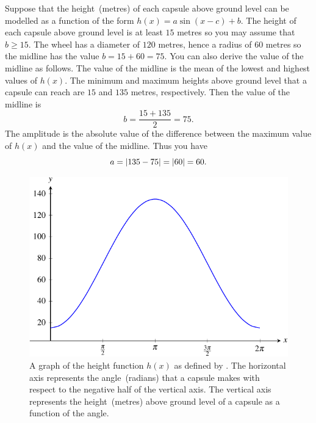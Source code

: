\documentclass[a4paper,oneside,12pt]{article}
\begin{document}
\begin{problem}
{\begin{solution}
Suppose that the height~(metres) of each capsule above ground level
can be modelled as a function of the form
$h(x) = a \sin(x - c) + b$.  The height of each capsule above ground
level is at least $15$ metres so you may assume that $b \geq 15$.  The
wheel has a diameter of $120$ metres, hence a radius of $60$ metres so
the midline has the value $b = 15 + 60 = 75$.  You can also derive the
value of the midline as follows.  The value of the midline is the mean
of the lowest and highest values of $h(x)$.  The minimum and maximum
heights above ground level that a capsule can reach are $15$ and $135$
metres, respectively.  Then the value of the midline is
\[
b
=
\frac{15 + 135}{2}
=
75.
\]
The amplitude is the absolute value of the difference between the
maximum value of $h(x)$ and the value of the midline.  Thus you have
\[
a
=
\lvert135 - 75\rvert
=
\lvert60\rvert
=
60.
\]

\begin{figure}[!htbp]
\centering
\includegraphics[scale=1.1]{image/13/london-eye-height.pdf}
\caption{%
  A graph of the height function $h(x)$ as defined by
  .  The horizontal axis
  represents the angle~(radians) that a capsule makes with respect to
  the negative half of the vertical axis.  The vertical axis
  represents the height~(metres) above ground level of a capsule as a
  function of the angle.
}
\label{fig:trigonometric:london_eye_height}
\end{figure}


\end{solution}}
\end{problem}
\end{document}
